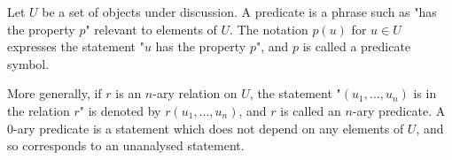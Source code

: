 Let $U$ be a set of objects under discussion. A predicate is a phrase such as "has the property $p$" relevant to elements of $U$. The notation $p(u)$ for $u \in U$ expresses the statement "$u$ has the property $p$", and $p$ is called a predicate symbol.

More generally, if $r$ is an $n$-ary relation on $U$, the statement "$(u_1, \ldots, u_n)$ is in the relation $r$" is denoted by $r(u_1, \ldots, u_n)$, and $r$ is called an $n$-ary predicate. A $0$-ary predicate is a statement which does not depend on any elements of $U$, and so corresponds to an unanalysed statement.